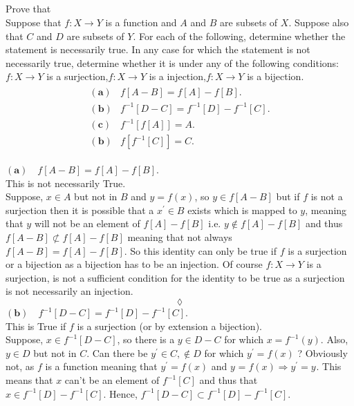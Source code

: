 \subsection{}
\begin{tcolorbox}
Prove that \\
Suppose that $f:X \rightarrow Y$ is a function and $A$ and $B$ are subsets of $X$. Suppose also that $C$ and $D$ are subsets of $Y$. For each of the following, determine whether the statement is necessarily true. In any case for which the statement is not necessarily true, determine whether it is under any of the following conditions: $f:X \rightarrow Y$  is a surjection,$f:X \rightarrow Y$  is a injection,$f:X \rightarrow Y$  is a bijection. 
\begin{align*}
\begin{array}{ll}
\mathbf{(a)}&f[A-B] = f[A]-f[B]. \\
\mathbf{(b)}&f^{-1}[D-C] = f^{-1}[D]-f^{-1}[C]. \\
\mathbf{(c)}&f^{-1}[f[A]] = A.\\
\mathbf{(b)}&f[f^{-1}[C]] = C.
\end{array}
\end{align*}
\end{tcolorbox}
$\mathbf{(a)}\quad f[A-B] = f[A]-f[B]$. \\
This is not necessarily True.\\
Suppose, $x\in A$ but not in $B$ and $y=f(x)$, so $y \in f[A-B]$ but if $f$ is not a surjection then it is possible that a $x^{'}\in B$ exists which is mapped to $y$, meaning that $y$ will not be an element of $f[A]-f[B]$ i.e. $y\not \in  f[A]-f[B]$ and thus $f[A-B] \not \subset  f[A]-f[B]$ meaning that not always $f[A-B] = f[A]-f[B]$. So this identity can only be true if $f$ is a surjection or a bijection as  a bijection has to be an injection. Of course $f:X \rightarrow Y$  is a surjection, is not a sufficient condition for the identity to be true as a surjection is not necessarily an injection.
$$\lozenge$$
$\mathbf{(b)}\quad f^{-1}[D-C] = f^{-1}[D]-f^{-1}[C]$.\\
This is True if $f$ is a surjection (or by extension a bijection).\\
Suppose, $x\in f^{-1}[D-C]$, so there is a $y \in D-C$ for which $x=f^{-1}(y)$. Also, $y\in D$ but not in $C$. Can there be $y^{'}\in C, \not \in D $ for which $y^{'}=f(x)$ ? Obviously not, as $f$ is a function meaning that $y^{'}=f(x)$ and  $y^{}=f(x)\Rightarrow y^{'}=y^{}$. This means that $x$ can't be an element of $f^{-1}[C]$ and thus that $x\in  f^{-1}[D]-f^{-1}[C]$. Hence, $f^{-1}[D-C] \subset f^{-1}[D]-f^{-1}[C]$.\\
